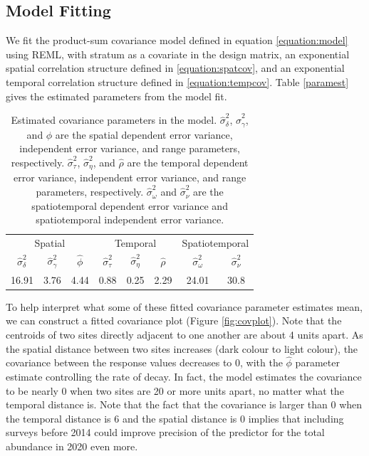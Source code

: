 \documentclass[]{interact}
\theoremstyle{plain}%
\theoremstyle{definition}
\theoremstyle{remark}
\begin{document}
\subsection{Model Fitting} \label{subsection:modelfit}

We fit the product-sum covariance model defined in equation
\ref{equation:model} using REML, with stratum as a covariate in the
design matrix, an exponential spatial correlation structure defined in
\ref{equation:spatcov}, and an exponential temporal correlation
structure defined in \ref{equation:tempcov}. Table \ref{paramest} gives
the estimated parameters from the model fit.

\begin{table}[H]

\caption{\label{tab:paramest}Estimated covariance parameters in the model. $\hat{\sigma}^2_{\delta}$, $\hat{\sigma}^2_{\gamma}$, and $\hat{\phi}$ are the spatial dependent error variance, independent error variance, and range parameters, respectively. $\hat{\sigma}^2_{\tau}$, $\hat{\sigma}^2_{\eta}$, and $\hat{\rho}$ are the temporal dependent error variance, independent error variance, and range parameters, respectively. $\hat{\sigma}^2_{\omega}$ and $\hat{\sigma}^2_{\nu}$ are the spatiotemporal dependent error variance and spatiotemporal independent error variance.}
\centering
\begin{tabular}[t]{cccccccc}
\toprule
\multicolumn{3}{c}{Spatial} & \multicolumn{3}{c}{Temporal} & \multicolumn{2}{c}{Spatiotemporal} \\
\cmidrule(l{3pt}r{3pt}){1-3} \cmidrule(l{3pt}r{3pt}){4-6} \cmidrule(l{3pt}r{3pt}){7-8}
$\hat{\sigma}^2_{\delta}$ & $\hat{\sigma}^2_{\gamma}$ & $\hat{\phi}$ & $\hat{\sigma}^2_{\tau}$ & $\hat{\sigma}^2_{\eta}$ & $\hat{\rho}$ & $\hat{\sigma}^2_{\omega}$ & $\hat{\sigma}^2_{\nu}$\\
\midrule
16.91 & 3.76 & 4.44 & 0.88 & 0.25 & 2.29 & 24.01 & 30.8\\
\bottomrule
\end{tabular}
\end{table}

To help interpret what some of these fitted covariance parameter
estimates mean, we can construct a fitted covariance plot (Figure
\ref{fig:covplot}). Note that the centroids of two sites directly
adjacent to one another are about 4 units apart. As the spatial distance
between two sites increases (dark colour to light colour), the
covariance between the response values decreases to 0, with the
\(\hat{\phi}\) parameter estimate controlling the rate of decay. In
fact, the model estimates the covariance to be nearly 0 when two sites
are 20 or more units apart, no matter what the temporal distance is.
Note that the fact that the covariance is larger than 0 when the
temporal distance is 6 and the spatial distance is 0 implies that
including surveys before 2014 could improve precision of the predictor
for the total abundance in 2020 even more.
\end{document}
